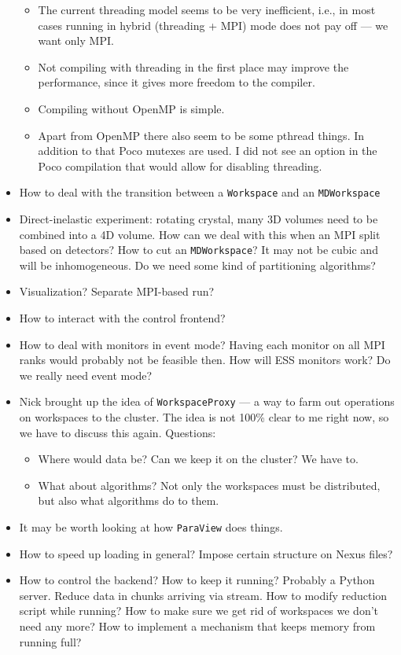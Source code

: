 \documentclass[a4paper,english,numbers=noenddot,bibliography=totoc,chapterprefix=on,DIV=12]{scrartcl}
\begin{document}
\begin{itemize}
    \begin{itemize}
      \item The current threading model seems to be very inefficient, i.e., in most cases running in hybrid (threading + MPI) mode does not pay off --- we want only MPI.
      \item Not compiling with threading in the first place may improve the performance, since it gives more freedom to the compiler.
      \item Compiling without OpenMP is simple.
      \item Apart from OpenMP there also seem to be some pthread things. In addition to that Poco mutexes are used. I did not see an option in the Poco compilation that would allow for disabling threading.
    \end{itemize}
  \item How to deal with the transition between a \texttt{Workspace} and an \texttt{MDWorkspace}
  \item Direct-inelastic experiment: rotating crystal, many 3D volumes need to be combined into a 4D volume.
    How can we deal with this when an MPI split based on detectors?
    How to cut an \texttt{MDWorkspace}?
    It may not be cubic and will be inhomogeneous.
    Do we need some kind of partitioning algorithms?
  \item Visualization?
    Separate MPI-based run?
  \item How to interact with the control frontend?
  \item How to deal with monitors in event mode?
    Having each monitor on all MPI ranks would probably not be feasible then.
    How will ESS monitors work?
    Do we really need event mode?
  \item Nick brought up the idea of \texttt{WorkspaceProxy} --- a way to farm out operations on workspaces to the cluster.
    The idea is not 100\% clear to me right now, so we have to discuss this again.
    Questions:
    \begin{itemize}
      \item Where would data be?
        Can we keep it on the cluster?
        We have to.
      \item What about algorithms?
        Not only the workspaces must be distributed, but also what algorithms do to them.
    \end{itemize}
  \item It may be worth looking at how \texttt{ParaView} does things.
  \item How to speed up loading in general?
    Impose certain structure on Nexus files?
  \item How to control the backend?
    How to keep it running?
    Probably a Python server.
    Reduce data in chunks arriving via stream.
    How to modify reduction script while running?
    How to make sure we get rid of workspaces we don't need any more?
    How to implement a mechanism that keeps memory from running full?
\end{itemize}
\end{document}
